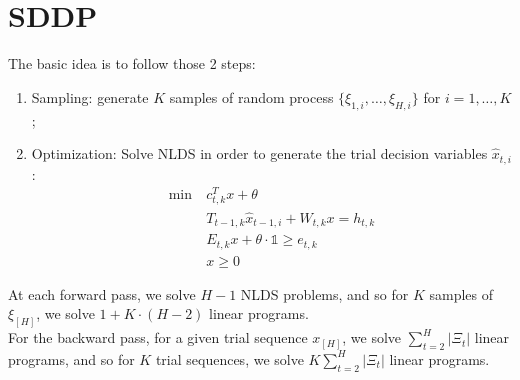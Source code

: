 \documentclass[12pt, openany]{report}
\theoremstyle{definition}
\begin{document}
\section{SDDP}
The basic idea is to follow those 2 steps:
\begin{enumerate}
	\item Sampling: generate $K$ samples of random process $\{\xi_{1,i},\dots, \xi_{H,i}\}$ for $i=1,\dots, K$;
	\item Optimization: Solve NLDS in order to generate the trial decision variables $\hat x_{t,i}$:
	\begin{equation}
		\begin{aligned}
			\min\ & c_{t,k}^Tx+\theta\\
			& T_{t-1,k}\hat x_{t-1,i} + W_{t,k}x = h_{t,k}\\
			& E_{t,k}x+\theta \cdot \mathbb{1} \ge e_{t,k}\\
			&x\ge 0
		\end{aligned}
	\end{equation}
\end{enumerate}
At each forward pass, we solve $H-1$ NLDS problems, and so for $K$ samples of $\xi_[H]$, we solve $1+K\cdot (H-2)$ linear programs. \\
For the backward pass, for a given trial sequence $x_{[H]}$, we solve $\sum_{t=2}^H|\Xi_t|$ linear programs, and so for $K$ trial sequences, we solve $K\sum_{t=2}^H|\Xi_t|$ linear programs. 
\end{document}
